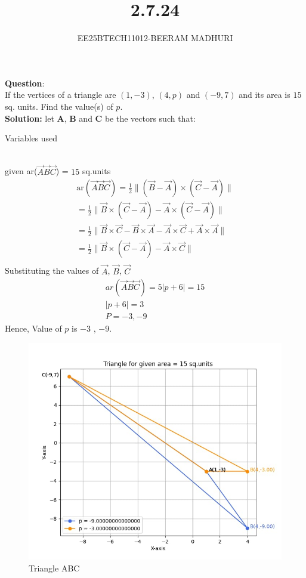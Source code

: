\documentclass[journal]{IEEEtran}
\begin{document}

\vspace{3cm}

\title{2.7.24}
\author{EE25BTECH11012-BEERAM MADHURI}
{\let\newpage\relax\maketitle}

\renewcommand{\thefigure}{\theenumi}
\renewcommand{\thetable}{\theenumi}
\setlength{\intextsep}{10pt} %


\renewcommand{\thetable}{\theenumi}
\textbf{Question}:\\
If the vertices of a triangle are $(1,-3)$, $(4, p)$ and $(-9, 7)$ and its area is $15$ sq. units. Find the value(s) of $p$.\\
\textbf{Solution: }
let $\mathbf{A}$, $\mathbf{B}$ and $\mathbf{C}$ be the vectors such that:
\begin{table}[h!]
    \centering
    
    \caption{Variables used}
    \label{table 2.7.24}
\end{table}\\
given {ar}($\Vec{A}$$\Vec{B}$$\Vec{C}$) = $15$ sq.units
\begin{align}
\text {ar}(\Vec{A}\Vec{B}\Vec{C}) = \frac{1}{2} \| (\vec{B}-\vec{A}) \times (\vec{C}-\vec{A}) \| \\
= \frac{1}{2} \| \vec{B} \times (\vec{C}-\vec{A}) - \vec{A} \times (\vec{C}-\vec{A}) \|\\
= \frac{1}{2} \|\vec{B} \times \vec{C} - \vec{B} \times \vec{A} - \vec{A} \times \vec{C} + \vec{A} \times \vec{A} \|\\
= \frac{1}{2} \| \vec{B} \times (\vec{C}-\vec{A}) - \vec{A} \times \vec{C} \|\\
\end{align}
Substituting the values of $\Vec{A}$,  $\Vec{B}$,  $\Vec{C}$
\begin{align}
{ar} (\Vec{A}\Vec{B}\Vec{C})= 5|p+6| = 15\\
|p+6| = 3\\
P=-3 , -9
\end{align}
Hence, Value of $p$ is $-3$ , $-9$.

\begin{figure}[H]
    \centering
    \includegraphics[width=0.75\columnwidth]{figs/graph-1.png}
    \caption{Triangle ABC}
    \label{fig:placeholder}
\end{figure}
\end{document}
